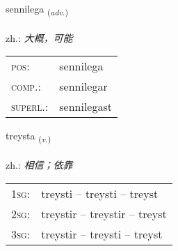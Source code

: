 \documentclass[frontgrid, backgrid]{flacards}\usepackage[]{graphicx}\usepackage[]{xcolor}
\begin{document}
\renewcommand{\flhead}{\vskip5pt \fboxsep=0pt {\small\bfseries\footnotesize Atviksorð | 副词}}
\renewcommand{\fcfoot}{\vskip5pt \fboxsep=0pt \hspace{2pt}{\small\bfseries\footnotesize 1K}}

\renewcommand{\blhead}{\vskip5pt {\small\bfseries\footnotesize Atviksorð | 副词 }}
\renewcommand{\bcfoot}{\vskip5pt \hspace{2pt}{\small\bfseries\footnotesize 1K}}


{sennilega \small{\textsubscript{(\textit{adv.})}} \\[1ex] %
\textphonetic{[sɛnɪlɛɣa]} \\
zh.: \emph{大概，可能} \\  [2ex]
\renewcommand*{\arraystretch}{0.8}
\begin{tabular}{ll}
\textsc{pos}: & sennilega \\ 
\textsc{comp.}: & sennilegar \\ 
\textsc{superl.}: & sennilegast \\
\end{tabular}
}

\renewcommand{\flhead}{\vskip5pt \fboxsep=0pt {\small\bfseries\footnotesize Sagnorð | 动词}}
\renewcommand{\fcfoot}{\vskip5pt \fboxsep=0pt \hspace{2pt}{\small\bfseries\footnotesize 1K}}

\renewcommand{\blhead}{\vskip5pt {\small\bfseries\footnotesize Sagnorð | 动词 }}
\renewcommand{\bcfoot}{\vskip5pt \hspace{2pt}{\small\bfseries\footnotesize 1K}}


{treysta \small{\textsubscript{(\textit{v.})}} \\[1ex] %
\textphonetic{[tʰreista]} \\
zh.: \emph{相信；依靠} \\  [2ex]
\renewcommand*{\arraystretch}{0.8}
\begin{tabular}{p{1cm}l}
\textsc{1sg}: & treysti -- treysti -- treyst \\ 
\textsc{2sg}: & treystir -- treystir -- treyst \\ 
\textsc{3sg}: & treystir -- treysti -- treyst \\ 
\end{tabular}
}
\end{document}
